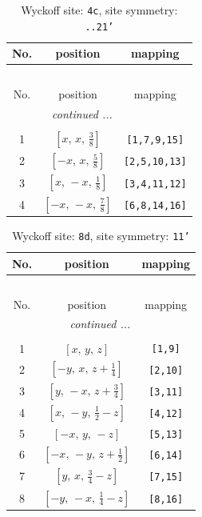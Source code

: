 \documentclass[fleqn,8pt]{jsarticle}
\begin{document}
\renewcommand{\arraystretch}{1.2}
\begin{longtable}{ccc}
\caption{Wyckoff site: {\tt 4c}, site symmetry: {\tt ..21'}}
 \\
 \hline \hline
No. & position & mapping \\ \hline \endfirsthead

\multicolumn{2}{l}{\tablename\ \thetable{}} \\
 \hline \hline
No. & position & mapping \\ \hline \endhead

 \hline \hline
\multicolumn{2}{r}{\footnotesize\it continued ...} \\ \endfoot

 \hline \hline
\multicolumn{2}{r}{} \\ \endlastfoot

1 & $\left[ x,\, x,\, \frac{3}{8} \right]$ & {\tt [1,7,9,15]} \\ \hline
2 & $\left[ - x,\, x,\, \frac{5}{8} \right]$ & {\tt [2,5,10,13]} \\ \hline
3 & $\left[ x,\, - x,\, \frac{1}{8} \right]$ & {\tt [3,4,11,12]} \\ \hline
4 & $\left[ - x,\, - x,\, \frac{7}{8} \right]$ & {\tt [6,8,14,16]} \\
\end{longtable}
\renewcommand{\arraystretch}{1.2}
\begin{longtable}{ccc}
\caption{Wyckoff site: {\tt 8d}, site symmetry: {\tt 11'}}
 \\
 \hline \hline
No. & position & mapping \\ \hline \endfirsthead

\multicolumn{2}{l}{\tablename\ \thetable{}} \\
 \hline \hline
No. & position & mapping \\ \hline \endhead

 \hline \hline
\multicolumn{2}{r}{\footnotesize\it continued ...} \\ \endfoot

 \hline \hline
\multicolumn{2}{r}{} \\ \endlastfoot

1 & $\left[ x,\, y,\, z \right]$ & {\tt [1,9]} \\ \hline
2 & $\left[ - y,\, x,\, z + \frac{1}{4} \right]$ & {\tt [2,10]} \\ \hline
3 & $\left[ y,\, - x,\, z + \frac{3}{4} \right]$ & {\tt [3,11]} \\ \hline
4 & $\left[ x,\, - y,\, \frac{1}{2} - z \right]$ & {\tt [4,12]} \\ \hline
5 & $\left[ - x,\, y,\, - z \right]$ & {\tt [5,13]} \\ \hline
6 & $\left[ - x,\, - y,\, z + \frac{1}{2} \right]$ & {\tt [6,14]} \\ \hline
7 & $\left[ y,\, x,\, \frac{3}{4} - z \right]$ & {\tt [7,15]} \\ \hline
8 & $\left[ - y,\, - x,\, \frac{1}{4} - z \right]$ & {\tt [8,16]} \\
\end{longtable}
\end{document}
